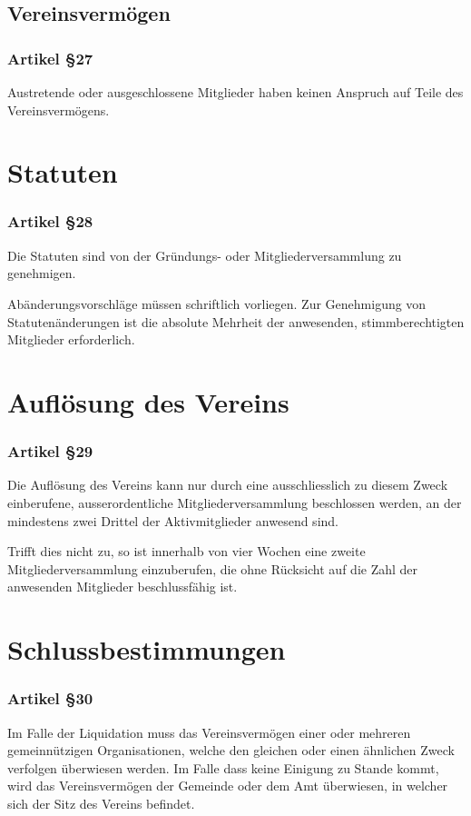 \documentclass[a4paper,
               10pt,
               fleqn]{article}
\begin{document}
\subsection{Vereinsvermögen}

\subsubsection*{Artikel §27}
Austretende oder ausgeschlossene Mitglieder haben keinen 
Anspruch auf Teile des Vereinsvermögens.

\section{Statuten}

\subsubsection*{Artikel §28}
Die Statuten sind von der Gründungs- oder 
Mitgliederversammlung zu genehmigen.

Abänderungsvorschläge müssen schriftlich vorliegen.
Zur Genehmigung von Statutenänderungen ist die absolute
Mehrheit der anwesenden, stimmberechtigten Mitglieder
erforderlich.

\section{Auflösung des Vereins}

\subsubsection*{Artikel §29}
Die Auflösung des Vereins kann nur durch eine
ausschliesslich zu diesem Zweck einberufene,
ausserordentliche Mitgliederversammlung beschlossen werden,
an der mindestens zwei Drittel der Aktivmitglieder anwesend
sind.

Trifft dies nicht zu, so ist innerhalb von vier Wochen eine 
zweite Mitgliederversammlung einzuberufen, die ohne
Rücksicht auf die Zahl der anwesenden Mitglieder
beschlussfähig ist.

\section{Schlussbestimmungen}

\subsubsection*{Artikel §30}
Im Falle der Liquidation muss das Vereinsvermögen einer oder
 mehreren gemeinnützigen Organisationen, welche den gleichen
oder einen ähnlichen Zweck verfolgen überwiesen werden. Im
Falle dass keine Einigung zu Stande kommt, wird das
Vereinsvermögen der Gemeinde oder dem Amt überwiesen, in 
welcher sich der Sitz des Vereins befindet.
\end{document}
